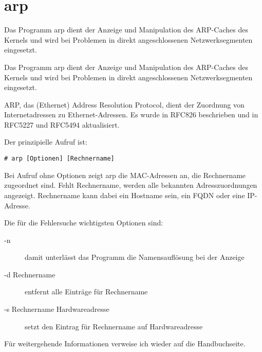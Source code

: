 \section{arp}
\label{sec:netz-werkzeuge-arp}
\begin{abstractsec}
  Das Programm arp dient der Anzeige und Manipulation des ARP-Caches des
  Kernels und wird bei Problemen in direkt angeschlossenen Netzwerksegmenten
  eingesetzt.
\end{abstractsec}
\begin{normaltext}
  Das Programm arp dient der Anzeige und Manipulation des ARP-Caches des
  Kernels und wird bei Problemen in direkt angeschlossenen Netzwerksegmenten
  eingesetzt.

  ARP, das (Ethernet) Address Resolution Protocol, dient der Zuordnung von
  Internetadressen zu Ethernet-Adressen. Es wurde in RFC826 beschrieben und in
  RFC5227 und RFC5494 aktualisiert.

  Der prinzipielle Aufruf ist:
  \begin{verbatim}
# arp [Optionen] [Rechnername]
  \end{verbatim}

  Bei Aufruf ohne Optionen zeigt arp die MAC-Adressen an, die Rechnername
  zugeordnet sind. Fehlt Rechnername, werden alle bekannten Adresszuordnungen
  angezeigt. Rechnername kann dabei ein Hostname sein, ein FQDN oder eine
  IP-Adresse.

  Die für die Fehlersuche wichtigsten Optionen sind:
  \begin{description}
    \item[-n] damit unterlässt das Programm die Namensauflösung bei der
      Anzeige
    \item[-d Rechnername] entfernt alle Einträge für Rechnername
    \item[-s Rechnername Hardwareadresse] setzt den Eintrag für Rechnername
      auf Hardwareadresse
  \end{description}
  Für weitergehende Informationen verweise ich wieder auf die Handbuchseite.
\end{normaltext}

